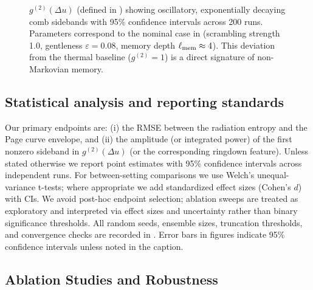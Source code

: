 \documentclass[a4paper,11pt]{article}
\theoremstyle{plain}
\theoremstyle{definition}
\theoremstyle{remark}
\newcommand{\datatableGtwo}{}
\begin{document}
\begin{figure}[htbp]
\centering
{}
\caption{$g^{(2)}(\Delta u)$ (defined in ) showing oscillatory, exponentially decaying comb sidebands with 95\% confidence intervals across 200 runs. Parameters correspond to the nominal case in  (scrambling strength 1.0, gentleness $\varepsilon=0.08$, memory depth $\ell_{\rm mem} \approx 4$). This deviation from the thermal baseline ($g^{(2)}=1$) is a direct signature of non-Markovian memory.}
\label{fig:g2}
\end{figure}

\subsection{Statistical analysis and reporting standards}
\label{ssec:stats}
Our primary endpoints are: (i) the RMSE between the radiation entropy and the Page curve envelope, and (ii) the amplitude (or integrated power) of the first nonzero sideband in $g^{(2)}(\Delta u)$ (or the corresponding ringdown feature). Unless stated otherwise we report point estimates with 95\% confidence intervals across independent runs. For between-setting comparisons we use Welch's unequal-variance t-tests; where appropriate we add standardized effect sizes (Cohen's $d$) with CIs. We avoid post-hoc endpoint selection; ablation sweeps are treated as exploratory and interpreted via effect sizes and uncertainty rather than binary significance thresholds. All random seeds, ensemble sizes, truncation thresholds, and convergence checks are recorded in . Error bars in figures indicate 95\% confidence intervals unless noted in the caption.

\subsection{Ablation Studies and Robustness}
\end{document}
